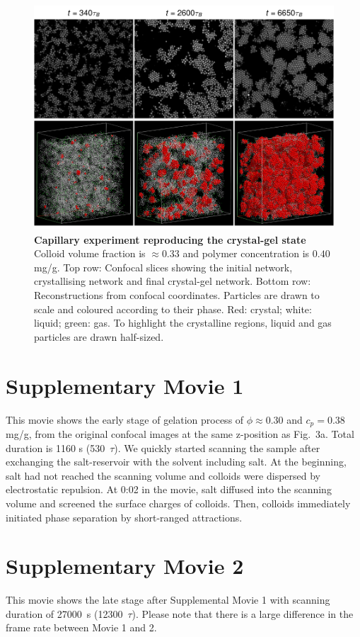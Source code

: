 \begin{figure}
\includegraphics{capillary.pdf}
\caption{\textbf{Capillary experiment reproducing the crystal-gel state} Colloid volume fraction is $\approx 0.33$ and polymer concentration is $0.40\,$mg/g. Top row: Confocal slices showing the initial network, crystallising network and final crystal-gel network. Bottom row: Reconstructions from confocal coordinates. Particles are drawn to scale and coloured according to their phase. Red: crystal; white: liquid; green: gas. To highlight the crystalline regions, liquid and gas particles are drawn half-sized.}
\label{fig:capillary}
\end{figure}



\clearpage
\section*{Supplementary Movie 1}
This movie shows the early stage of gelation process of $\phi\approx 0.30$ and $c_p=0.38$ mg/g, from the original confocal images at the same z-position as Fig.~3a. Total duration is 1160 s (530~$\tau$). We quickly started scanning the sample after exchanging the salt-reservoir with the solvent including salt. At the beginning, salt had not reached the scanning volume and colloids were dispersed by electrostatic repulsion. At 0:02 in the movie, salt diffused into the scanning volume and screened the surface charges of colloids. Then, colloids immediately initiated phase separation by short-ranged attractions.

\section*{Supplementary Movie 2}
This movie shows the late stage after Supplemental Movie 1 with scanning duration of 27000~s (12300~$\tau$). 
Please note that there is a large difference in the frame rate between Movie 1 and 2. 






